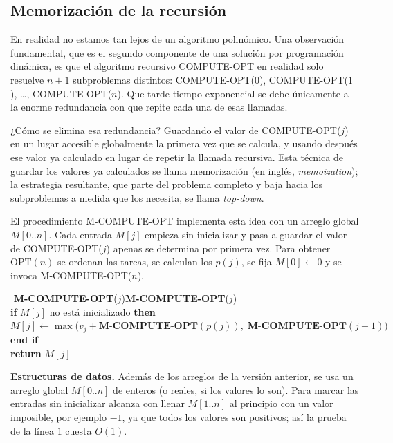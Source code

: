 \documentclass[12pt, spanish, oneside, openany]{book}
\newcommand{\pl}[1]{\makebox[1.6em][r]{\texttt{\footnotesize #1}}\hspace{0.9em}}
\newenvironment{pseudo}[1]{%
  \begin{center}%
  \begin{mdframed}[style=pseudobox]%
  \small
  \begin{tabbing}%
  \hspace{2.5em}\=\hspace{1.5em}\=\hspace{1.5em}\=\hspace{1.5em}\=\hspace{1.5em}\=\kill
  \def\pseudotitulo{#1}\ifx\pseudotitulo\empty\else#1\\[3pt]\fi}%
  {\end{tabbing}\end{mdframed}\end{center}}
\newenvironment{estructuras}%
  {\begin{center}\begin{minipage}{0.93\textwidth}\begin{mdframed}[style=estrbox]%
   \small\textbf{Estructuras de datos.}\;}%
  {\end{mdframed}\end{minipage}\end{center}}
\newcommand{\alg}[1]{#1}
\theoremstyle{uprightplain}
\theoremstyle{definition}
\theoremstyle{remark}
\theoremstyle{definition}
\newcommand{\OPT}{\mathrm{OPT}} %
\begin{document}
\subsection{Memorización de la recursión}

En realidad no estamos tan lejos de un algoritmo polinómico. Una observación fundamental, que es el segundo componente de una solución por programación dinámica, es que el algoritmo recursivo \alg{COMPUTE-OPT} en realidad solo resuelve $n+1$ subproblemas distintos: \alg{COMPUTE-OPT}($0$), \alg{COMPUTE-OPT}($1$), \dots, \alg{COMPUTE-OPT}($n$). Que tarde tiempo exponencial se debe únicamente a la enorme redundancia con que repite cada una de esas llamadas.

¿Cómo se elimina esa redundancia? Guardando el valor de \alg{COMPUTE-OPT}($j$) en un lugar accesible globalmente la primera vez que se calcula, y usando después ese valor ya calculado en lugar de repetir la llamada recursiva. Esta técnica de guardar los valores ya calculados se llama memorización (en inglés, \emph{memoization}); la estrategia resultante, que parte del problema completo y baja hacia los subproblemas a medida que los necesita, se llama \emph{top-down}.

El procedimiento \alg{M-COMPUTE-OPT} implementa esta idea con un arreglo global $M[0..n]$. Cada entrada $M[j]$ empieza sin inicializar y pasa a guardar el valor de \alg{COMPUTE-OPT}($j$) apenas se determina por primera vez. Para obtener $\OPT(n)$ se ordenan las tareas, se calculan los $p(j)$, se fija $M[0]\leftarrow 0$ y se invoca \alg{M-COMPUTE-OPT}($n$).

\begin{pseudo}{\textbf{M-COMPUTE-OPT}($j$)}
\pl{1}\> \textbf{if} $M[j]$ no está inicializado \textbf{then}\\
\pl{2}\>\> $M[j] \leftarrow \max\bigl(v_j+\textbf{M-COMPUTE-OPT}(p(j)),\;\textbf{M-COMPUTE-OPT}(j-1)\bigr)$\\
\pl{3}\> \textbf{end if}\\
\pl{4}\> \textbf{return} $M[j]$
\end{pseudo}

\begin{estructuras}
Además de los arreglos de la versión anterior, se usa un arreglo global
$M[0..n]$ de enteros (o reales, si los valores lo son). Para marcar las
entradas sin inicializar alcanza con llenar $M[1..n]$ al principio con un valor
imposible, por ejemplo $-1$, ya que todos los valores son positivos; así la
prueba de la línea $1$ cuesta $O(1)$.
\end{estructuras}
\end{document}
